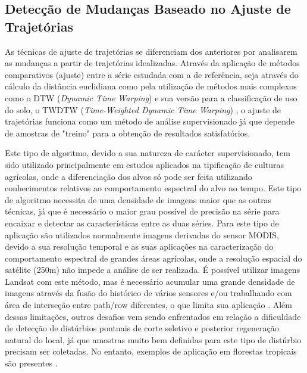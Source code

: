\documentclass[12pt,a4paper]{article}
\begin{document}
\subsection{Detecção de Mudanças Baseado no Ajuste de Trajetórias}
As técnicas de ajuste de trajetórias se diferenciam dos anteriores por analisarem as mudanças a partir de trajetórias idealizadas. Através da aplicação de métodos comparativos (ajuste) entre a série estudada com a de referência, seja através do cálculo da distância euclidiana como pela utilização de métodos mais complexos como o DTW (\textit{Dynamic Time Warping}) \citep{VELICHKO1970223, SakoeChiba71, Berndt1994} e sua versão para a classificação de uso do solo, o TWDTW (\textit{Time-Weighted Dynamic Time Warping}) \citep{Maus2016, Maus2019}, o ajuste de trajetórias funciona como um método de análise supervisionado já que depende de amostras de "treino" para a obtenção de resultados satisfatórios.

Este tipo de algoritmo, devido a sua natureza de carácter supervisionado, tem sido utilizado principalmente em estudos aplicados na tipificação de culturas agrícolas, onde a diferenciação dos alvos só pode ser feita utilizando conhecimentos relativos ao comportamento espectral do alvo no tempo. Este tipo de algoritmo necessita de uma densidade de imagens maior que as outras técnicas, já que é necessário o maior grau possível de precisão na série para encaixar e detectar as características entre as duas séries. Para este tipo de aplicação são utilizados normalmente imagens derivadas do sensor MODIS, devido a sua resolução temporal e as suas aplicações na caracterização do comportamento espectral de grandes áreas agrícolas, onde a resolução espacial do satélite (250m) não impede a análise de ser realizada. É possível utilizar imagens Landsat com este método, mas é necessário acumular uma grande densidade de imagens através da fusão do histórico de vários sensores e/ou trabalhando com área de interseção entre path/row diferentes, o que limita sua aplicação \citep{Bendini2016}. Além dessas limitações, outros desafios vem sendo enfrentados em relação a dificuldade de detecção de distúrbios pontuais de corte seletivo e posterior regeneração natural do local, já que amostras muito bem definidas para este tipo de distúrbio precisam ser coletadas. No entanto, exemplos de aplicação em florestas tropicais são presentes \citep{Hirschmugl2013, KENNEDY2007370}.
\end{document}
